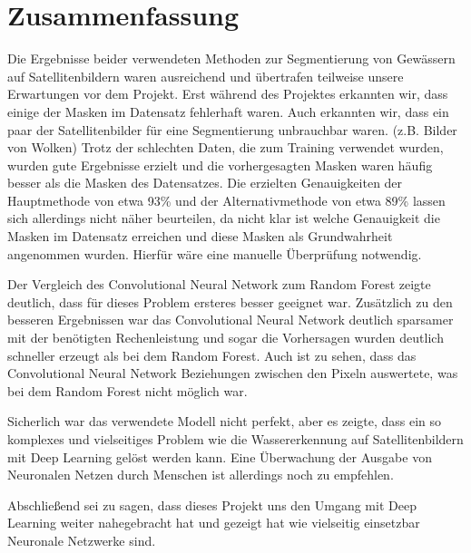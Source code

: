 \section{Zusammenfassung}
\label{sec:Zusammenfassung}

Die Ergebnisse beider verwendeten Methoden zur Segmentierung von Gewässern auf Satellitenbildern waren ausreichend
und übertrafen teilweise unsere Erwartungen vor dem Projekt.
Erst während des Projektes erkannten wir, dass einige der Masken im Datensatz fehlerhaft waren.
Auch erkannten wir, dass ein paar der Satellitenbilder für eine Segmentierung unbrauchbar waren. (z.B. Bilder von Wolken)
Trotz der schlechten Daten, die zum Training verwendet wurden, wurden gute Ergebnisse erzielt 
und die vorhergesagten Masken waren häufig besser als die Masken des Datensatzes.
Die erzielten Genauigkeiten der Hauptmethode von etwa 93\% und der Alternativmethode von etwa 89\% lassen sich allerdings nicht näher beurteilen, 
da nicht klar ist welche Genauigkeit die Masken im Datensatz erreichen und diese Masken als Grundwahrheit angenommen wurden.
Hierfür wäre eine manuelle Überprüfung notwendig.

Der Vergleich des Convolutional Neural Network zum Random Forest zeigte deutlich, dass für dieses Problem ersteres besser geeignet war.
Zusätzlich zu den besseren Ergebnissen war das Convolutional Neural Network deutlich sparsamer mit der benötigten Rechenleistung 
und sogar die Vorhersagen wurden deutlich schneller erzeugt als bei dem Random Forest.
Auch ist zu sehen, dass das Convolutional Neural Network Beziehungen zwischen den Pixeln auswertete, was bei dem Random Forest nicht möglich war.

Sicherlich war das verwendete Modell nicht perfekt, aber es zeigte, dass ein so komplexes und vielseitiges Problem 
wie die Wassererkennung auf Satellitenbildern mit Deep Learning gelöst werden kann.
Eine Überwachung der Ausgabe von Neuronalen Netzen durch Menschen ist allerdings noch zu empfehlen.

Abschließend sei zu sagen, dass dieses Projekt uns den Umgang mit Deep Learning weiter nahegebracht hat 
und gezeigt hat wie vielseitig einsetzbar Neuronale Netzwerke sind.
